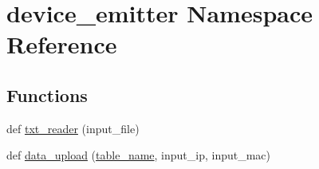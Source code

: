 \hypertarget{namespacedevice__emitter}{}\section{device\+\_\+emitter Namespace Reference}
\label{namespacedevice__emitter}
\subsection*{Functions}
\begin{DoxyCompactItemize}
\item 
def \mbox{\hyperlink{namespacedevice__emitter_a37babfaa6ea3bbb358c94516521f9442}{txt\+\_\+reader}} (input\+\_\+file)
\item 
def \mbox{\hyperlink{namespacedevice__emitter_a3d36fb9ab99c12fae8dff6cae0b9c309}{data\+\_\+upload}} (\mbox{\hyperlink{namespacedevice__emitter_ae71d803969e8f98677e12dc98159d6de}{table\+\_\+name}}, input\+\_\+ip, input\+\_\+mac)
\end{DoxyCompactItemize}
